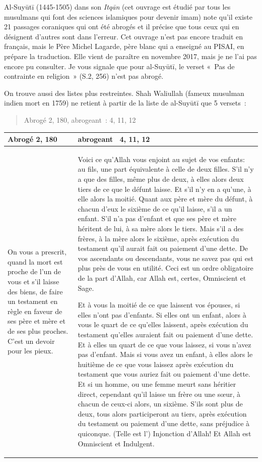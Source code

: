 Al-Suyūtī (1445-1505) dans son \emph{Itqān} (cet ouvrage est étudié par
tous les musulmans qui font des sciences islamiques pour devenir imam)
note qu'il existe 21 passages coraniques qui ont été abrogés et il
précise que tous ceux qui en désignent d'autres sont dans l'erreur. Cet
ouvrage n'est pas encore traduit en français, mais le Père Michel
Lagarde, père blanc qui a enseigné au PISAI, en prépare la traduction.
Elle vient de paraître en novembre 2017, mais je ne l'ai pas encore pu
consulter. Je vous signale que pour al-Suyūtī, le verset «~Pas de
contrainte en religion~» (S.2, 256) n'est pas abrogé.

On trouve aussi des listes plus restreintes. Shah Waliullah (fameux
musulman indien mort en 1759) ne retient à partir de la liste de
al-Suyūtī que 5 versets~:

\begin{quote}
Abrogé 2, 180, abrogeant~: 4, 11, 12
\end{quote}

\begin{longtable}{p{4cm}p{8cm}}

\toprule
Abrogé 2, 180 & abrogeant~ 4, 11, 12\\
\midrule
\endhead
On vous a prescrit, quand la mort est proche de l'un de vous et s'il
laisse des biens, de faire un testament en règle en faveur de ses père
et mère et de ses plus proches. C'est un devoir pour les pieux. & Voici
ce qu'Allah vous enjoint au sujet de vos enfants: au fils, une part
équivalente à celle de deux filles. S'il n'y a que des filles, même plus
de deux, à elles alors deux tiers de ce que le défunt laisse. Et s'il
n'y en a qu'une, à elle alors la moitié. Quant aux père et mère du
défunt, à chacun d'eux le sixième de ce qu'il laisse, s'il a un enfant.
S'il n'a pas d'enfant et que ses père et mère héritent de lui, à sa mère
alors le tiers. Mais s'il a des frères, à la mère alors le sixième,
après exécution du testament qu'il aurait fait ou paiement d'une dette.
De vos ascendants ou descendants, vous ne savez pas qui est plus près de
vous en utilité. Ceci est un ordre obligatoire de la part d'Allah, car
Allah est, certes, Omniscient et Sage.

Et à vous la moitié de ce que laissent vos épouses, si elles n'ont pas
d'enfants. Si elles ont un enfant, alors à vous le quart de ce qu'elles
laissent, après exécution du testament qu'elles auraient fait ou
paiement d'une dette. Et à elles un quart de ce que vous laissez, si
vous n'avez pas d'enfant. Mais si vous avez un enfant, à elles alors le
huitième de ce que vous laissez après exécution du testament que vous
auriez fait ou paiement d'une dette. Et si un homme, ou une femme meurt
sans héritier direct, cependant qu'il laisse un frère ou une sœur, à
chacun de ceux-ci alors, un sixième. S'ils sont plus de deux, tous alors
participeront au tiers, après exécution du testament ou paiement d'une
dette, sans préjudice à quiconque. (Telle est l') Injonction d'Allah! Et
Allah est Omniscient et Indulgent. \\
\bottomrule
\end{longtable}

